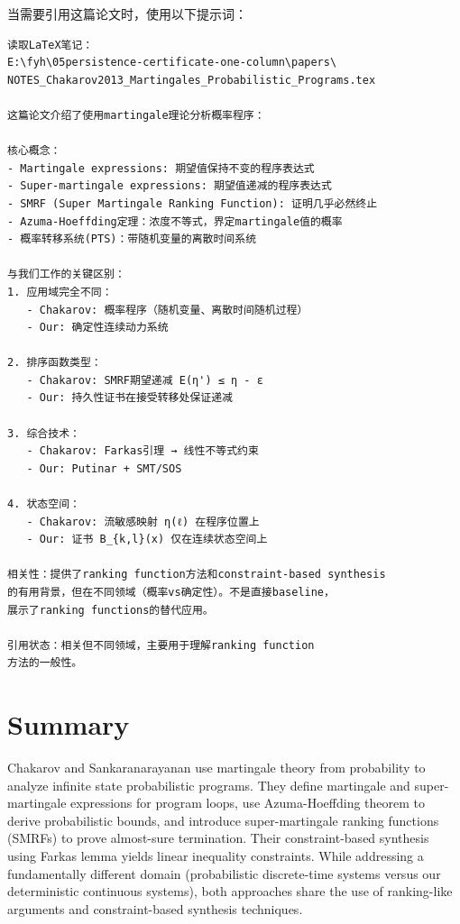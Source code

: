 \documentclass{article}
\begin{document}
当需要引用这篇论文时，使用以下提示词：

\begin{verbatim}
读取LaTeX笔记：
E:\fyh\05persistence-certificate-one-column\papers\
NOTES_Chakarov2013_Martingales_Probabilistic_Programs.tex

这篇论文介绍了使用martingale理论分析概率程序：

核心概念：
- Martingale expressions: 期望值保持不变的程序表达式
- Super-martingale expressions: 期望值递减的程序表达式
- SMRF (Super Martingale Ranking Function): 证明几乎必然终止
- Azuma-Hoeffding定理：浓度不等式，界定martingale值的概率
- 概率转移系统(PTS)：带随机变量的离散时间系统

与我们工作的关键区别：
1. 应用域完全不同：
   - Chakarov: 概率程序（随机变量、离散时间随机过程）
   - Our: 确定性连续动力系统

2. 排序函数类型：
   - Chakarov: SMRF期望递减 E(η') ≤ η - ε
   - Our: 持久性证书在接受转移处保证递减

3. 综合技术：
   - Chakarov: Farkas引理 → 线性不等式约束
   - Our: Putinar + SMT/SOS

4. 状态空间：
   - Chakarov: 流敏感映射 η(ℓ) 在程序位置上
   - Our: 证书 B_{k,l}(x) 仅在连续状态空间上

相关性：提供了ranking function方法和constraint-based synthesis
的有用背景，但在不同领域（概率vs确定性）。不是直接baseline，
展示了ranking functions的替代应用。

引用状态：相关但不同领域，主要用于理解ranking function
方法的一般性。
\end{verbatim}

\section{Summary}

Chakarov and Sankaranarayanan use martingale theory from probability to analyze infinite state probabilistic programs. They define martingale and super-martingale expressions for program loops, use Azuma-Hoeffding theorem to derive probabilistic bounds, and introduce super-martingale ranking functions (SMRFs) to prove almost-sure termination. Their constraint-based synthesis using Farkas lemma yields linear inequality constraints. While addressing a fundamentally different domain (probabilistic discrete-time systems versus our deterministic continuous systems), both approaches share the use of ranking-like arguments and constraint-based synthesis techniques.
\end{document}
